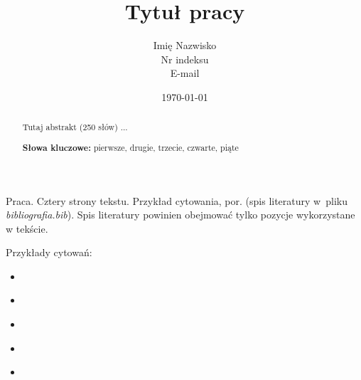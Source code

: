 \documentclass[a4paper, 11pt]{article}
\author{Imię Nazwisko\\Nr indeksu\\E-mail}
\title{Tytuł pracy}
\date{\today}
\begin{document}
\maketitle

\begin{abstract}
  Tutaj abstrakt (250 słów) ...
  
  \noindent
  \textbf{Słowa kluczowe:} pierwsze, drugie, trzecie, czwarte, piąte
\end{abstract}

\newpage %

Praca. Cztery strony tekstu. Przykład cytowania, por. \citep{przyklad} (spis literatury w~pliku \textit{bibliografia.bib}). Spis literatury powinien obejmować tylko pozycje wykorzystane w tekście.

Przykłady cytowań:
\begin{itemize}
\item \cite{typografia}
\item \citep{typografia}
\item \cite[s.~12]{typografia}
\item \citeauthor{typografia}
\item \citeyear{typografia}
\end{itemize}


\newpage  



\end{document}
